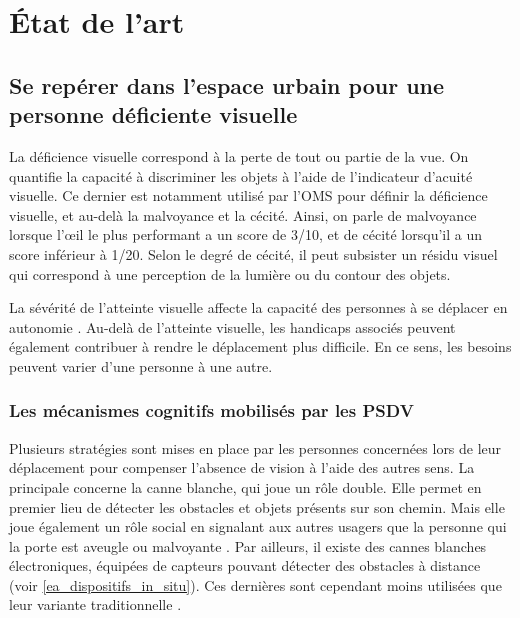 \chapter{État de l'art}

\section{Se repérer dans l'espace urbain pour une personne déficiente visuelle}

%
%

La déficience visuelle correspond à la perte de tout ou partie de la vue. On quantifie la capacité à discriminer les objets à l'aide de l'indicateur d'acuité visuelle. Ce dernier est notamment utilisé par l'OMS pour définir la déficience visuelle, et au-delà la malvoyance et la cécité. Ainsi, on parle de malvoyance lorsque l'œil le plus performant a un score de 3/10, et de cécité lorsqu'il a un score inférieur à 1/20. Selon le degré de cécité, il peut subsister un résidu visuel qui correspond à une perception de la lumière ou du contour des objets. 

La sévérité de l'atteinte visuelle affecte la capacité des personnes à se déplacer en autonomie \cite{homere_2023}. Au-delà de l'atteinte visuelle, les handicaps associés peuvent également contribuer à rendre le déplacement plus difficile. En ce sens, les besoins peuvent varier d'une personne à une autre.

\subsection{Les mécanismes cognitifs mobilisés par les PSDV}

%
%

Plusieurs stratégies sont mises en place par les personnes concernées lors de leur déplacement pour compenser l'absence de vision à l'aide des autres sens. La principale concerne la canne blanche, qui joue un rôle double. Elle permet en premier lieu de détecter les obstacles et objets présents sur son chemin. Mais elle joue également un rôle social en signalant aux autres usagers que la personne qui la porte est aveugle ou malvoyante \cite{ratelle_manuel_2019}. Par ailleurs, il existe des cannes blanches électroniques, équipées de capteurs pouvant détecter des obstacles à distance (voir \ref{ea_dispositifs_in_situ}). Ces dernières sont cependant moins utilisées que leur variante traditionnelle \cite{homere_2023}. 

